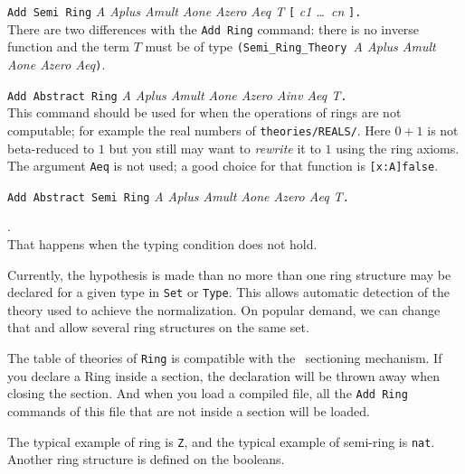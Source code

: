 \begin{Variants}
\item \texttt{Add Semi Ring} \textit{A Aplus Amult Aone Azero Aeq T} 
  \texttt{[} \textit{c1 \dots\ cn} \texttt{].}\\
  There are two differences with the \texttt{Add Ring} command: 
  there is no inverse function and the term $T$ must be of type 
  \texttt{(Semi\_Ring\_Theory }\textit{A Aplus Amult Aone Azero
  Aeq}\texttt{)}.  

\item \texttt{Add Abstract Ring} \textit{A Aplus Amult Aone Azero Ainv 
    Aeq T}\texttt{.}\\
  This command should be used for when the operations of rings are not 
  computable; for example the real numbers of
  \texttt{theories/REALS/}. Here $0+1$ is not beta-reduced to $1$ but
  you still may want to \textit{rewrite} it to $1$ using the ring
  axioms. The argument \texttt{Aeq} is not used; a good choice for
  that function is \verb+[x:A]false+.

\item \texttt{Add Abstract Semi Ring} \textit{A Aplus Amult Aone Azero
    Aeq T}\texttt{.}\\

\end{Variants}

\begin{ErrMsgs}
\item {}.\\ 
  That happens when the typing condition does not hold.
\end{ErrMsgs}

Currently, the hypothesis is made than no more than one ring structure
may be declared for a given type in \texttt{Set} or \texttt{Type}.
This allows automatic detection of the theory used to achieve the
normalization. On popular demand, we can change that and allow several
ring structures on the same set.

The table of theories of \texttt{Ring} is compatible with the \Coq\ 
sectioning mechanism. If you declare a Ring inside a section, the
declaration will be thrown away when closing the section.
And when you load a compiled file, all the \texttt{Add Ring}
commands of this file that are not inside a section will be loaded.

The typical example of ring is \texttt{Z}, and the typical example of
semi-ring is \texttt{nat}. Another ring structure is defined on the
booleans. 


